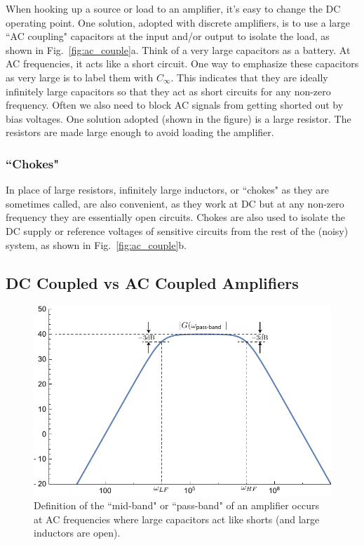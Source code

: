 When hooking up a source or load to an amplifier, it's easy to change the DC operating point.  One solution, adopted with discrete amplifiers, is to use a large ``AC coupling" capacitors at the input and/or output to isolate the load, as shown in Fig.~\ref{fig:ac_couple}a. Think of a very large capacitors as a battery. At AC frequencies, it acts like a short circuit.  One way to emphasize these capacitors as very large is to label them with $C_\infty$. This indicates that they are ideally infinitely large capacitors so that they act as short circuits for any non-zero frequency.  Often we also need to block AC signals from getting shorted out by bias voltages.  One solution adopted (shown in the figure) is a large resistor.  The resistors are made large enough to avoid loading the amplifier.
\subsubsection{``Chokes"}
In place of large resistors, infinitely large inductors, or ``chokes" as they are sometimes called, are also convenient, as they work at DC but at any non-zero frequency they are essentially open circuits.  Chokes are also used to isolate the DC supply or reference voltages of sensitive circuits from the rest of the (noisy) system, as shown in Fig.~\ref{fig:ac_couple}b.
\subsection{DC Coupled vs AC Coupled Amplifiers}
\begin{figure}[tb]
\begin{center}
\includegraphics[width=.6\columnwidth]{amp_bandpass}
\end{center}
\caption{Definition of the ``mid-band" or ``pass-band" of an amplifier occurs at AC frequencies where large capacitors act like shorts (and large inductors are open).}
\label{fig:cgamp_is}
\end{figure}

